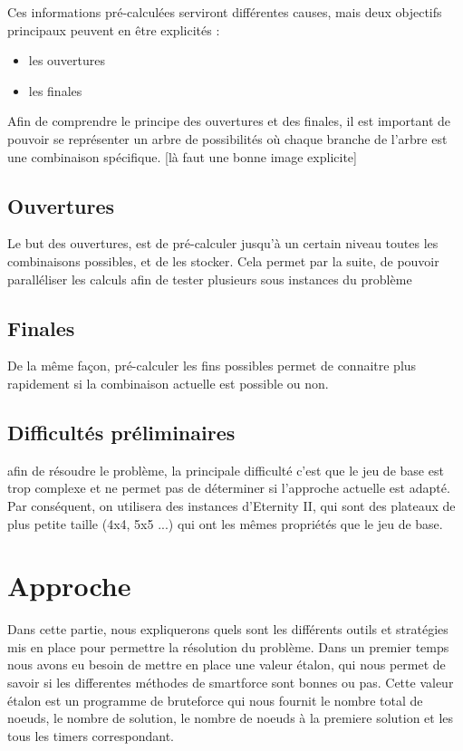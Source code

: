 \documentclass{article}
\begin{document}
	Ces informations pré-calculées serviront différentes causes, mais deux objectifs principaux peuvent en être explicités :
	
	\begin{itemize}
		\item les ouvertures
		\item les finales
	\end{itemize}
	
	Afin de comprendre le principe des ouvertures et des finales, il est important de pouvoir se représenter un arbre de possibilités où chaque branche de l'arbre est une combinaison spécifique. [là faut une bonne image explicite]
	
	\subsection{Ouvertures}
	
	Le but des ouvertures, est de pré-calculer jusqu'à un certain niveau toutes les combinaisons possibles, et de les stocker. Cela permet par la suite, de pouvoir paralléliser les calculs afin de tester plusieurs sous instances du problème
	
	\subsection{Finales}
	
	De la même façon, pré-calculer les fins possibles permet de connaitre plus rapidement si la combinaison actuelle est possible ou non.
	
	
	\subsection{Difficultés préliminaires}
	
	afin de résoudre le problème, la principale difficulté c'est que le jeu de base est trop complexe et ne permet pas de déterminer si l'approche actuelle est adapté. Par conséquent, on utilisera des instances d'Eternity II, qui sont des plateaux de plus petite taille (4x4, 5x5 ...) qui ont les mêmes propriétés que le jeu de base.
	
	\section{Approche}

	Dans cette partie, nous expliquerons quels sont les différents outils et stratégies mis en place pour permettre la résolution du problème.
	Dans un premier temps nous avons eu besoin de mettre en place une valeur étalon, qui nous permet de savoir si les differentes méthodes de smartforce sont bonnes ou pas. Cette valeur étalon est un programme de bruteforce qui nous fournit le nombre total de noeuds, le nombre de solution, le nombre de noeuds à la premiere solution et les tous les timers correspondant.
	
\end{document}
